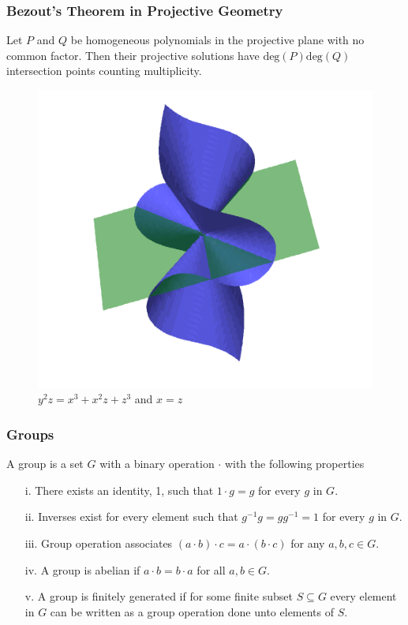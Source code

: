 \documentclass{beamer}
\begin{document}
\begin{frame}
\begin{figure}[H]
\begin{minipage}[b]{0.4\linewidth}
\label{fig:b}
\end{minipage}
\end{figure}
\end{frame}

\begin{frame}
\frametitle{Bezout's Theorem in Projective Geometry}
Let $P$ and $Q$ be homogeneous polynomials in the 
projective plane with no common factor. Then 
their projective solutions have 
$\text{deg}(P) \text{deg}(Q)$ intersection points 
counting multiplicity. 
\begin{figure}[H]
\centering
\includegraphics[width=.6\textwidth]{projective-intersection}
\caption{$y^2z = x^3 + x^2z + z^3$ and $x=z$}
\end{figure}
\end{frame}

\begin{frame}
\frametitle{Groups}
\begin{definition}
A group is a set $G$ with a binary operation $\cdot$ with the following properties
\begin{itemize}
\item[i.] There exists an identity, 1, such that $1\cdot g = g$ for every $g$ in $G$.
\item[ii.] Inverses exist for every element such that $g^{-1} g = gg^{-1} = 1$ for
every $g$ in $G$.
\item[iii.] Group operation associates $(a\cdot b) \cdot c = a \cdot (b \cdot c)$
for any $a,b,c \in G$.
\item[iv.] A group is abelian if $a \cdot b = b \cdot a$ for all $a,b \in G$.
\item[v.] A group is finitely generated if for some finite subset $S\subseteq G$ every
element in $G$ can be written as a group operation done unto elements of
$S$.
\end{itemize}
\end{definition}
\end{frame}
\end{document}

